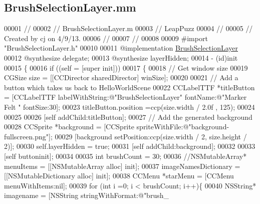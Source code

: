 \hypertarget{_brush_selection_layer_8mm}{\subsection{Brush\-Selection\-Layer.\-mm}
\label{d2/d04/_brush_selection_layer_8mm}
}

\begin{DoxyCode}
00001 \textcolor{comment}{//}
00002 \textcolor{comment}{//  BrushSelectionLayer.m}
00003 \textcolor{comment}{//  LeapPuzz}
00004 \textcolor{comment}{//}
00005 \textcolor{comment}{//  Created by cj on 4/9/13.}
00006 \textcolor{comment}{//}
00007 \textcolor{comment}{//}
00008 
00009 \textcolor{preprocessor}{#import "BrushSelectionLayer.h"}
00010 
00011 \textcolor{keyword}{@implementation }\hyperlink{interface_brush_selection_layer}{BrushSelectionLayer}
00012 \textcolor{keyword}{@synthesize} delegate;
00013 \textcolor{keyword}{@synthesize} layerHidden;
00014 - (id)init
00015 \{
00016     \textcolor{keywordflow}{if} ((\textcolor{keyword}{self} = [super init]))
00017     \{
00018         \textcolor{comment}{// Get window size}
00019         CGSize size = [[CCDirector sharedDirector] winSize];
00020         
00021         \textcolor{comment}{// Add a button which takes us back to HelloWorldScene}
00022         CCLabelTTF *titleButton = [CCLabelTTF labelWithString:@"BrushSelectionLayer" fontName:@"Marker Felt
      " fontSize:30];
00023         titleButton.position =ccp(size.width / 2.0f , 125);
00024         
00025         
00026         [\textcolor{keyword}{self} addChild:titleButton];
00027         \textcolor{comment}{// Add the generated background}
00028         CCSprite *background = [CCSprite spriteWithFile:@"background-fullscreen.png"];
00029         [background setPosition:ccp(size.width / 2, size.height / 2)];
00030         \textcolor{keyword}{self}.layerHidden = \textcolor{keyword}{true};
00031         [\textcolor{keyword}{self} addChild:background];
00032         
00033         [\textcolor{keyword}{self} buttoninit];
00034         
00035         \textcolor{keywordtype}{int} brushCount = 30;
00036         \textcolor{comment}{//NSMutableArray* menuItems = [[NSMutableArray alloc] init];}
00037         imageNamesDictionary = [[NSMutableDictionary alloc] init];
00038         CCMenu *starMenu = [CCMenu menuWithItems:nil];
00039         \textcolor{keywordflow}{for} (\textcolor{keywordtype}{int} i =0; i < brushCount; i++)\{
00040             NSString* imagename = [NSString stringWithFormat:@"brush\_%

\end{DoxyCode}
